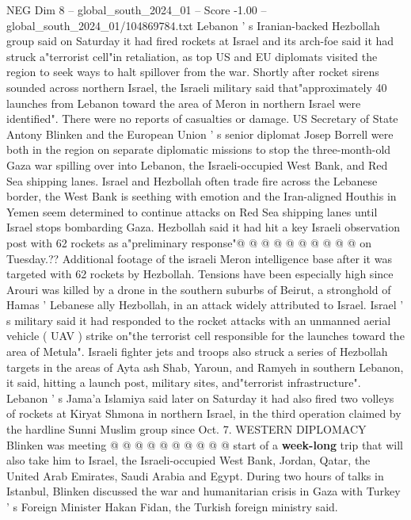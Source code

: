 \begin{textsample}{NEG Dim 8 – global\_south\_2024\_01 – Score -1.00 – global\_south\_2024\_01/104869784.txt}  \label{ex:f8_neg_053}
Lebanon ' s Iranian-backed Hezbollah group said on Saturday it had fired rockets at Israel and its arch-foe said it had struck a"terrorist cell"in retaliation, as top US and EU diplomats visited the region to seek ways to halt spillover from the war.
Shortly after rocket sirens sounded across northern Israel, the Israeli military said that"approximately 40 launches from Lebanon toward the area of Meron in northern Israel were identified".
There were no reports of casualties or damage.
US Secretary of State Antony Blinken and the European Union ' s senior diplomat Josep Borrell were both in the region on separate diplomatic missions to stop the three-month-old Gaza war spilling over into Lebanon, the Israeli-occupied West Bank, and Red Sea shipping lanes.
Israel and Hezbollah often trade fire across the Lebanese border, the West Bank is seething with emotion and the Iran-aligned Houthis in Yemen seem determined to continue attacks on Red Sea shipping lanes until Israel stops bombarding Gaza.
Hezbollah said it had hit a key Israeli observation post with 62 rockets as a"preliminary response"@ @ @ @ @ @ @ @ @ @ on Tuesday.??
Additional footage of the israeli Meron intelligence base after it was targeted with 62 rockets by Hezbollah.
Tensions have been especially high since Arouri was killed by a drone in the southern suburbs of Beirut, a stronghold of Hamas ' Lebanese ally Hezbollah, in an attack widely attributed to Israel.
Israel ' s military said it had responded to the rocket attacks with an unmanned aerial vehicle ( UAV ) strike on"the terrorist cell responsible for the launches toward the area of Metula".
Israeli fighter jets and troops also struck a series of Hezbollah targets in the areas of Ayta ash Shab, Yaroun, and Ramyeh in southern Lebanon, it said, hitting a launch post, military sites, and"terrorist infrastructure".
Lebanon ' s Jama'a Islamiya said later on Saturday it had also fired two volleys of rockets at Kiryat Shmona in northern Israel, in the third operation claimed by the hardline Sunni Muslim group since Oct. 7.
WESTERN DIPLOMACY Blinken was meeting @ @ @ @ @ @ @ @ @ @ start of a \textbf{week-long} trip that will also take him to Israel, the Israeli-occupied West Bank, Jordan, Qatar, the United Arab Emirates, Saudi Arabia and Egypt.
During two hours of talks in Istanbul, Blinken discussed the war and humanitarian crisis in Gaza with Turkey ' s Foreign Minister Hakan Fidan, the Turkish foreign ministry said.

\end{textsample}
